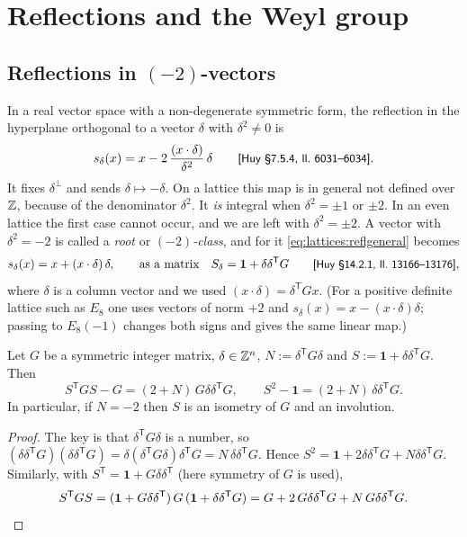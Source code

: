\section{Reflections and the Weyl group}\label{sec:lattices:reflections}

\subsection{Reflections in \texorpdfstring{$(-2)$}{(-2)}-vectors}
In a real vector space with a non-degenerate symmetric form, the reflection in the
hyperplane orthogonal to a vector
$\delta$ with $\delta^2\ne0$ is
\begin{equation}\label{eq:lattices:reflgeneral}
 s_\delta(x)=x-2\,\frac{(x\cdot\delta)}{\delta^2}\,\delta
 \qquad\text{{\small\textsf{[Huy §7.5.4, ll.~6031--6034]}}} .
\end{equation}
It fixes $\delta^\perp$ and sends $\delta\mapsto-\delta$. On a lattice this map is in general
not defined over $\mathbb{Z}$, because of the denominator $\delta^2$. It \emph{is} integral when
$\delta^2=\pm1$ or $\pm2$. In an even lattice the first case cannot occur, and we are left
with $\delta^2=\pm2$. A vector with $\delta^2=-2$ is called a \emph{root} or
\emph{$(-2)$-class}, and for it \eqref{eq:lattices:reflgeneral} becomes
\begin{equation}\label{eq:lattices:refl}
 s_\delta(x)=x+(x\cdot\delta)\,\delta ,\qquad\text{as a matrix}\quad
 S_\delta=\mathbf1+\delta\delta^{\mathsf T}G
 \qquad\text{{\small\textsf{[Huy §14.2.1, ll.~13166--13176]}}} ,
\end{equation}
where $\delta$ is a column vector and we used $(x\cdot\delta)=\delta^{\mathsf T}Gx$. (For a
positive definite lattice such as $E_8$ one uses vectors of norm $+2$ and
$s_\delta(x)=x-(x\cdot\delta)\delta$; passing to $E_8(-1)$ changes both signs and gives the
same linear map.)

\begin{proposition}\label{prop:lattices:reflection}
Let $G$ be a symmetric integer matrix, $\delta\in\mathbb{Z}^n$, $N:=\delta^{\mathsf T}G\delta$ and
$S:=\mathbf1+\delta\delta^{\mathsf T}G$. Then
\begin{equation}\label{eq:lattices:reflidentity}
 S^{\mathsf T}GS-G=(2+N)\,G\delta\delta^{\mathsf T}G,\qquad
 S^2-\mathbf1=(2+N)\,\delta\delta^{\mathsf T}G .
\end{equation}
In particular, if $N=-2$ then $S$ is an isometry of $G$ and an involution.
\end{proposition}
\begin{proof}
The key is that $\delta^{\mathsf T}G\delta$ is a number, so
$(\delta\delta^{\mathsf T}G)(\delta\delta^{\mathsf T}G)=\delta(\delta^{\mathsf T}G\delta)
\delta^{\mathsf T}G=N\,\delta\delta^{\mathsf T}G$. Hence
$S^2=\mathbf1+2\delta\delta^{\mathsf T}G+N\delta\delta^{\mathsf T}G$. Similarly, with
$S^{\mathsf T}=\mathbf1+G\delta\delta^{\mathsf T}$ (here symmetry of $G$ is used),
\[
 S^{\mathsf T}GS=(\mathbf1+G\delta\delta^{\mathsf T})\,G\,(\mathbf1+\delta\delta^{\mathsf T}G)
 =G+2\,G\delta\delta^{\mathsf T}G+N\,G\delta\delta^{\mathsf T}G . \qedhere
\]
\end{proof}

